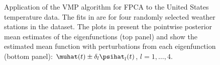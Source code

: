\documentclass[12pt]{article}
\theoremstyle{plain}
\theoremstyle{definition}
\theoremstyle{remark}
\begin{document}
\begin{figure}[t!]
\centering
\tabskip=0pt
\caption{
	Application of the VMP algorithm for FPCA to the United States temperature data. The fits in 
	are for four randomly selected weather stations in the dataset.
	The plots in  present the pointwise posterior mean estimates of the eigenfunctions
	(top panel) and
	show the estimated mean function with
	perturbations from each eigenfunction (bottom panel): $\muhat (t) \pm \delta_l \psihat_l (t)$,
	$l = 1, \dots, 4$.
}
\label{fig:us_weather_data}
\end{figure}
\end{document}
